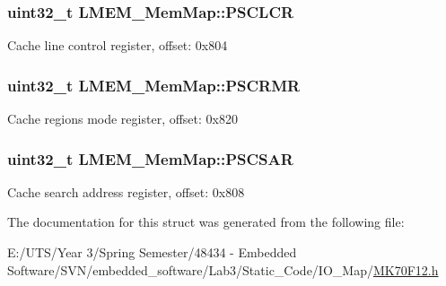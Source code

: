 \subsubsection[{P\+S\+C\+L\+C\+R}]{\setlength{\rightskip}{0pt plus 5cm}uint32\+\_\+t L\+M\+E\+M\+\_\+\+Mem\+Map\+::\+P\+S\+C\+L\+C\+R}\label{struct_l_m_e_m___mem_map_a9002773a5254b5d1ebb9a46218ef21c4}
Cache line control register, offset\+: 0x804 \hypertarget{struct_l_m_e_m___mem_map_a06dad54d3dcb178443d2c9b0d5ae2496}{}
\subsubsection[{P\+S\+C\+R\+M\+R}]{\setlength{\rightskip}{0pt plus 5cm}uint32\+\_\+t L\+M\+E\+M\+\_\+\+Mem\+Map\+::\+P\+S\+C\+R\+M\+R}\label{struct_l_m_e_m___mem_map_a06dad54d3dcb178443d2c9b0d5ae2496}
Cache regions mode register, offset\+: 0x820 \hypertarget{struct_l_m_e_m___mem_map_ad54ebfe0c32863df5645bc4416dfe3dc}{}
\subsubsection[{P\+S\+C\+S\+A\+R}]{\setlength{\rightskip}{0pt plus 5cm}uint32\+\_\+t L\+M\+E\+M\+\_\+\+Mem\+Map\+::\+P\+S\+C\+S\+A\+R}\label{struct_l_m_e_m___mem_map_ad54ebfe0c32863df5645bc4416dfe3dc}
Cache search address register, offset\+: 0x808 

The documentation for this struct was generated from the following file\+:\begin{DoxyCompactItemize}
\item 
E\+:/\+U\+T\+S/\+Year 3/\+Spring Semester/48434 -\/ Embedded Software/\+S\+V\+N/embedded\+\_\+software/\+Lab3/\+Static\+\_\+\+Code/\+I\+O\+\_\+\+Map/\hyperlink{_m_k70_f12_8h}{M\+K70\+F12.\+h}\end{DoxyCompactItemize}
